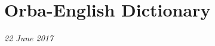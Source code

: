 \documentclass[a4paper]{article}
\begin{document}
\newcommand{\display}[2]{ \BeginAccSupp{method=escape,ActualText=#2}%
\textbf{#1}%
\EndAccSupp{}\textbf{,} }

\newcommand{\head}[1]{#1,}

\newcommand{\partofspeech}[1]{\textit{#1}.}

\newcommand{\definition}[1]{#1}

\newcommand{\letter}[1]{\bigskip\section*{#1}\hangparas{1em}{1}}

\newcommand{\example}[2]{---\textit{#1}, #2}

\newcommand{\bio}[1]{\textit{#1}}

\newcommand{\igboizugbe}[1]{[Igbo: \textit{#1}.]}

\newcommand{\hd}[1]{\d{\'#1}}
\newcommand{\md}[1]{\ifthenelse{\equal{#1}{i}}%
                              {\d{\=\i}}%
                              {\d{\=#1}}}
\newcommand{\ld}[1]{\d{\`#1}}

\newcommand{\h}[1]{\'#1}
\newcommand{\m}[1]{\ifthenelse{\equal{#1}{i}}%
                              {\=\i}%
                              {\=#1}}
\renewcommand{\l}[1]{\`#1}

\newcommand{\reference}[1]{\textbf{#1}}

\newcommand{\+}{\textschwa}

\newcommand{\termslot}{
{\large \textbf{Term} (with pronunciation) \\

{Part of Speech:} \\

{Meaning:} \\

{Example sentence:} \\

{Translation:}} \\
\bigskip
}

\section*{Orba-English Dictionary}
\emph{22 June 2017}
\end{document}
